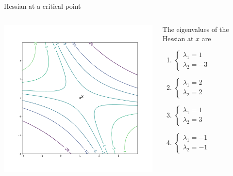 \documentclass{beamer}
\begin{document}
\begin{frame}[t]{Hessian at a critical point}

	\vspace{-1.6cm}
	\begin{columns}
		\begin{column}{0.7\textwidth}
			\hspace*{-1.7cm}
			\includegraphics[width=11.0cm]{contour_saddle.pdf}
		\end{column}
		\hspace*{0.2cm}
		\begin{column}{0.29\textwidth}
			The eigenvalues of the Hessian at $x$ are
			\begin{enumerate}
				\item $
					\begin{cases}
						\lambda_1 = 1 \\
						\lambda_2 = -3
					\end{cases}
					$
				\item $
					\begin{cases}
						\lambda_1 = 2 \\
						\lambda_2 = 2
					\end{cases}
					$
				\item $
					\begin{cases}
						\lambda_1 = 1 \\
						\lambda_2 = 3
					\end{cases}
					$
				\item $
					\begin{cases}
						\lambda_1 = -1 \\
						\lambda_2 = -1
					\end{cases}
					$
			\end{enumerate}
		\end{column}
	\end{columns}

\end{frame}
\end{document}
